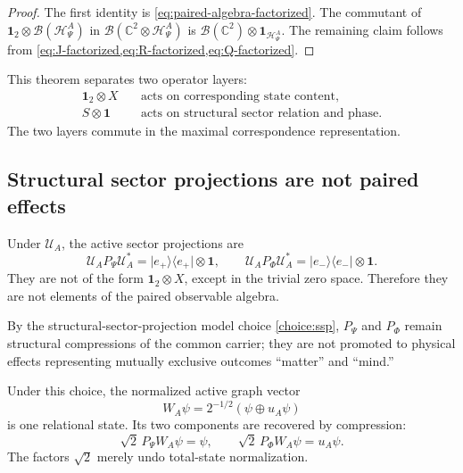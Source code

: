 \documentclass[11pt,reqno]{scrartcl}
\newcommand{\CC}{\mathbb C}
\newcommand{\PP}{P_{\Psi}}
\newcommand{\PF}{P_{\Phi}}
\newcommand{\idop}{\mathbf 1}
\newcommand{\polA}{u_A}
\newcommand{\ket}[1]{\lvert #1\rangle}
\newcommand{\bra}[1]{\langle #1\rvert}
\newcommand{\proj}[1]{\ket{#1}\!\bra{#1}}
\newcommand{\actHP}{\mathscr H_{\Psi}^{A}}
\newcommand{\WA}{W_{A}}
\newcommand{\UA}{\mathcal U_{A}}
\newcommand{\eplus}{e_{+}}
\newcommand{\eminus}{e_{-}}
\theoremstyle{plain}
\theoremstyle{definition}
\theoremstyle{remark}
\begin{document}
\begin{proof}
The first identity is \eqref{eq:paired-algebra-factorized}.  The commutant of
\(\idop_2\otimes\mathcal B(\actHP)\) in
\(\mathcal B(\CC^2\otimes\actHP)\) is
\(\mathcal B(\CC^2)\otimes\idop_{\actHP}\).  The remaining claim follows
from \cref{eq:J-factorized,eq:R-factorized,eq:Q-factorized}.
\end{proof}

This theorem separates two operator layers:
\begin{equation}
  \boxed{
  \begin{aligned}
  \idop_2\otimes X
  &\quad\text{acts on corresponding state content},\\
  S\otimes\idop
  &\quad\text{acts on structural sector relation and phase}.
  \end{aligned}}
  \label{eq:content-sector-operator-separation}
\end{equation}
The two layers commute in the maximal correspondence representation.

\subsection{Structural sector projections are not paired effects}

Under \(\UA\), the active sector projections are
\begin{equation}
  \UA\PP\UA^*
  =\proj{\eplus}\otimes\idop,
  \qquad
  \UA\PF\UA^*
  =\proj{\eminus}\otimes\idop.
  \label{eq:sector-projections-factorized}
\end{equation}
They are not of the form \(\idop_2\otimes X\), except in the trivial zero
space.  Therefore they are not elements of the paired observable algebra.

By the structural-sector-projection model choice \cref{choice:ssp},
\(\PP\) and \(\PF\) remain structural compressions of the common carrier;
they are not promoted to physical effects representing mutually exclusive
outcomes ``matter'' and ``mind.''

Under this choice, the normalized active graph vector
\begin{equation}
  \WA\psi
  =2^{-1/2}(\psi\oplus\polA\psi)
  \label{eq:SSP-total-state}
\end{equation}
is one relational state.  Its two components are recovered by compression:
\begin{equation}
  \sqrt2\,\PP\WA\psi=\psi,
  \qquad
  \sqrt2\,\PF\WA\psi=\polA\psi.
  \label{eq:SSP-compressions}
\end{equation}
The factors \(\sqrt2\) merely undo total-state normalization.
\end{document}
